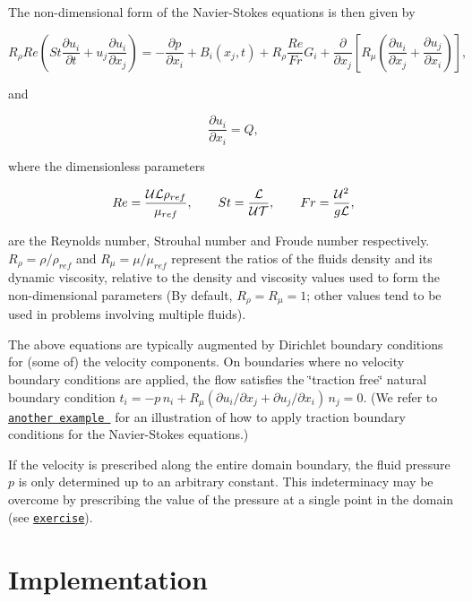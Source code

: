 The non-\/dimensional form of the Navier-\/\+Stokes equations is then given by \begin{center} \[ R_\rho Re \left( St \frac{\partial u_i}{\partial t} + u_j \frac{\partial u_i}{\partial x_j} \right) = - \frac{\partial p}{\partial x_i} + B_i(x_j,t) + R_\rho \frac{Re}{Fr} G_i + \frac{\partial }{\partial x_j} \left[ R_\mu \left( \frac{\partial u_i}{\partial x_j} + \frac{\partial u_j}{\partial x_i} \right) \right], \] \end{center}  and \begin{center} \[ \frac{\partial u_i}{\partial x_i} = Q, \] \end{center}  where the dimensionless parameters \begin{center} \[ Re = \frac{{\cal U}{\cal L}\rho_{ref}}{\mu_{ref}}, \qquad St = \frac{{\cal L}}{{\cal U}{\cal T}}, \qquad Fr = \frac{{\cal U}^2}{g{\cal L}}, \] \end{center}  are the Reynolds number, Strouhal number and Froude number respectively. $ R_\rho=\rho/\rho_{ref} $ and $ R_\mu =\mu/\mu_{ref}$ represent the ratios of the fluid\textquotesingle{}s density and its dynamic viscosity, relative to the density and viscosity values used to form the non-\/dimensional parameters (By default, $ R_\rho = R_\mu = 1 $; other values tend to be used in problems involving multiple fluids).

The above equations are typically augmented by Dirichlet boundary conditions for (some of) the velocity components. On boundaries where no velocity boundary conditions are applied, the flow satisfies the \char`\"{}traction free\char`\"{} natural boundary condition $ t_i = -p \, n_i + R_\mu (\partial u_i/\partial x_j + \partial u_j/\partial x_i ) \, n_j = 0. $ (We refer to \href{../../rayleigh_traction_channel/html/index.html}{\tt another example } for an illustration of how to apply traction boundary conditions for the Navier-\/\+Stokes equations.)

If the velocity is prescribed along the entire domain boundary, the fluid pressure $ p $ is only determined up to an arbitrary constant. This indeterminacy may be overcome by prescribing the value of the pressure at a single point in the domain (see \href{#exercises}{\tt exercise}). 

 

\hypertarget{index_element_types}{}\section{Implementation}\label{index_element_types}


